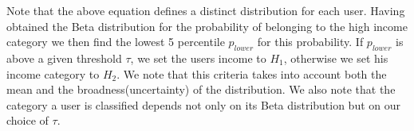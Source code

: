 Note that the above equation defines a distinct distribution for each user. Having obtained the Beta distribution for the probability of belonging to the high income category we then find the lowest 5 percentile $p_{lower}$ for this probability. If $p_{lower}$ is above a given threshold $\tau$, we set the users income to $H_1$, otherwise we set his income category to $H_2$. We note that this criteria takes into account both the mean and the broadness(uncertainty) of the distribution. We also note that the category a user is classified depends not only on its Beta distribution but on our choice of $\tau$. 

 
 






